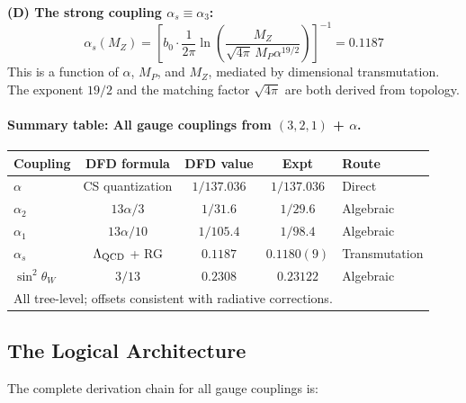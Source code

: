 \bigskip
\noindent\textbf{(D) The strong coupling $\alpha_s \equiv \alpha_3$:}
\begin{equation}
\boxed{\alpha_s(M_Z) = \left[b_0 \cdot \frac{1}{2\pi}
\ln\!\left(\frac{M_Z}{\sqrt{4\pi}\, M_P \alpha^{19/2}}\right)\right]^{-1} = 0.1187}
\end{equation}
This is a function of $\alpha$, $M_P$, and $M_Z$, mediated by dimensional transmutation.
The exponent $19/2$ and the matching factor $\sqrt{4\pi}$ are both derived from topology.

\paragraph{Summary table: All gauge couplings from $(3,2,1)$ + $\alpha$.}

\begin{center}
\renewcommand{\arraystretch}{1.4}
\begin{tabular}{lcccl}
\toprule
Coupling & DFD formula & DFD value & Expt & Route \\
\midrule
$\alpha$ & CS quantization & $1/137.036$ & $1/137.036$ & Direct \\
$\alpha_2$ & $13\alpha/3$ & $1/31.6$ & $1/29.6$ & Algebraic \\
$\alpha_1$ & $13\alpha/10$ & $1/105.4$ & $1/98.4$ & Algebraic \\
$\alpha_s$ & $\Lambda_{\rm QCD}$ + RG & $0.1187$ & $0.1180(9)$ & Transmutation \\
$\sin^2\theta_W$ & $3/13$ & $0.2308$ & $0.23122$ & Algebraic \\
\midrule
\multicolumn{5}{l}{\footnotesize All tree-level; offsets consistent with radiative corrections.}\\
\bottomrule
\end{tabular}
\end{center}

\subsection{The Logical Architecture}

The complete derivation chain for all gauge couplings is:

